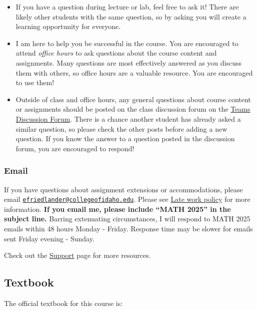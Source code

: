\documentclass[
  letterpaper,
  DIV=11,
  numbers=noendperiod]{scrartcl}
\providecommand{\tightlist}{%
  \setlength{\itemsep}{0pt}\setlength{\parskip}{0pt}}
\begin{document}
\begin{itemize}
\tightlist
\item
  If you have a question during lecture or lab, feel free to ask it!
  There are likely other students with the same question, so by asking
  you will create a learning opportunity for everyone.
\item
  I am here to help you be successful in the course. You are encouraged
  to attend \emph{office hours} to ask questions about the course
  content and assignments. Many questions are most effectively answered
  as you discuss them with others, so office hours are a valuable
  resource. You are encouraged to use them!
\item
  Outside of class and office hours, any general questions about course
  content or assignments should be posted on the class discussion forum
  on the
  \href{https://teams.microsoft.com/l/channel/19\%3AvBRIeFRpxyUJfvl-0Ur9bQWxhR_Wzkpr6iM6V_OBVKA1\%40thread.tacv2/?groupId=ffcfc61b-032c-4fe3-883b-fe9fd969ea51}{Teams
  Discussion Forum}. There is a chance another student has already asked
  a similar question, so please check the other posts before adding a
  new question. If you know the answer to a question posted in the
  discussion forum, you are encouraged to respond!
\end{itemize}

\subsubsection{Email}\label{email}

If you have questions about assignment extensions or accommodations,
please email
\href{mailto:efriedlander@collegeofidaho.edu}{\nolinkurl{efriedlander@collegeofidaho.edu}}.
Please see \hyperref[late-work-policy]{Late work policy} for more
information. \textbf{If you email me, please include ``MATH 2025'' in
the subject line.} Barring extenuating circumstances, I will respond to
MATH 2025 emails within 48 hours Monday - Friday. Response time may be
slower for emails sent Friday evening - Sunday.

Check out the \href{support.qmd}{Support} page for more resources.

\subsection{Textbook}\label{textbook}

The official textbook for this course is:
\end{document}
